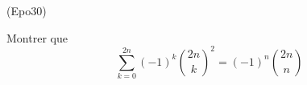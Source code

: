 \begin{tiny}(Epo30)\end{tiny} Montrer que
\begin{displaymath}
 \sum_{k=0}^{2n}(-1)^k\binom{2n}{k}^2
=(-1)^n\binom{2n}{n}
\end{displaymath}
 